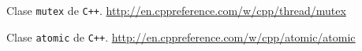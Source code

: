 \begin{thebibliography}{2}

Clase \texttt{mutex} de \texttt{C++}.
\url{http://en.cppreference.com/w/cpp/thread/mutex}

Clase \texttt{atomic} de \texttt{C++}.
\url{http://en.cppreference.com/w/cpp/atomic/atomic}


\end{thebibliography}